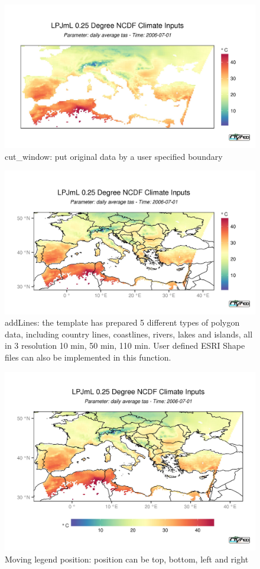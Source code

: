 \documentclass[a4paper,10pt]{article}
\begin{document}
\begin{figure}
  \centering
    \includegraphics[width=1.2\textwidth]{origin_window}
  \caption{cut\_window: put original data by a user specified boundary}
\end{figure}
\begin{figure}
  \centering
    \includegraphics[width=1.2\textwidth]{origin_add_text}
  \caption{addLines: the template has prepared 5 different types of polygon data, including country lines,
	  coastlines, rivers, lakes and islands, all in 3 resolution 10 min, 50 min, 110 min. User defined
	  ESRI Shape files can also be implemented in this function.}
\end{figure}
\begin{figure}
  \centering
    \includegraphics[width=1.2\textwidth]{origin_move_legend}
  \caption{Moving legend position: position can be top, bottom, left and right}
\end{figure}
\end{document}
